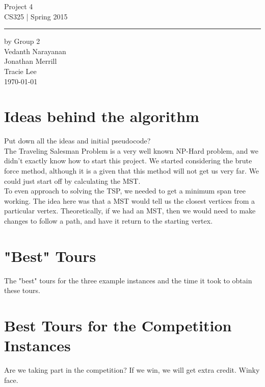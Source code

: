 \documentclass[11pt,letterpaper]{article}
\begin{document}
\begin{titlepage}
    \vspace*{4cm}
    \begin{flushright}
    {\huge
        Project 4\\[5mm]
    }
    {\large
        CS325 | Spring 2015
     }
    \end{flushright}
\hrule
    \begin{flushright}
	by Group 2\\
	Vedanth Narayanan\\
	Jonathan Merrill\\
	Tracie Lee\\
    \vfill
	\today\\
    \end{flushright}
\end{titlepage}

\raggedright

\section*{Ideas behind the algorithm}
Put down all the ideas and initial pseudocode? \\
The Traveling Salesman Problem is a very well known NP-Hard problem, and we didn't exactly know how to start this project. We started considering the brute force method, although it is a given that this method will not get us very far. We could just start off by calculating the MST.\\

To even approach to solving the TSP, we needed to get a minimum span tree working. The idea here was that a MST would tell us the closest vertices from a particular vertex. Theoretically, if we had an MST, then we would need to make changes to follow a path, and have it return to the starting vertex. 

\section*{"Best" Tours}
The "best" tours for the three example instances and the time it took to obtain these tours.

\section*{Best Tours for the Competition Instances}
Are we taking part in the competition? If we win, we will get extra credit. Winky face.
\end{document}
